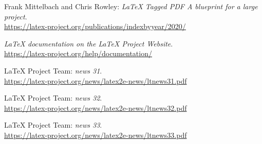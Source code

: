 \documentclass{ltnews}
\providecommand\Dash {\unskip \textemdash}
\begin{document}
\medskip

\begin{thebibliography}{9}

\fontsize{9.3}{11.3}\selectfont

 Frank Mittelbach and Chris Rowley:
  \emph{\LaTeX{} Tagged PDF \Dash A blueprint for a large project}.\\
  \url{https://latex-project.org/publications/indexbyyear/2020/}

  \emph{\LaTeX{} documentation on the \LaTeX{} Project Website}.\\
  \url{https://latex-project.org/help/documentation/}

 \LaTeX{} Project Team:
  \emph{\LaTeXe{} news 31}.\\
  \url{https://latex-project.org/news/latex2e-news/ltnews31.pdf}

 \LaTeX{} Project Team:
  \emph{\LaTeXe{} news 32}.\\
  \url{https://latex-project.org/news/latex2e-news/ltnews32.pdf}

 \LaTeX{} Project Team:
  \emph{\LaTeXe{} news 33}.\\
  \url{https://latex-project.org/news/latex2e-news/ltnews33.pdf}

\end{thebibliography}
\end{document}
